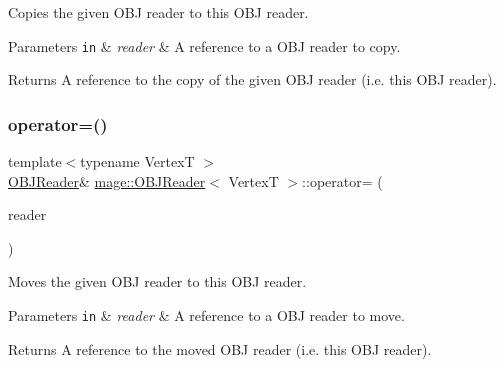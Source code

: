 Copies the given O\+BJ reader to this O\+BJ reader.


\begin{DoxyParams}[1]{Parameters}
\mbox{\tt in}  & {\em reader} & A reference to a O\+BJ reader to copy. \\
\hline
\end{DoxyParams}
\begin{DoxyReturn}{Returns}
A reference to the copy of the given O\+BJ reader (i.\+e. this O\+BJ reader). 
\end{DoxyReturn}
\hypertarget{classmage_1_1_o_b_j_reader_ac795c3b1d19ecf38735b76bc5b97fa80}{}\label{classmage_1_1_o_b_j_reader_ac795c3b1d19ecf38735b76bc5b97fa80} 
\subsubsection{\texorpdfstring{operator=()}{operator=()}\hspace{0.1cm}{\footnotesize\ttfamily [2/2]}}
{\footnotesize\ttfamily template$<$typename VertexT $>$ \\
\hyperlink{classmage_1_1_o_b_j_reader}{O\+B\+J\+Reader}\& \hyperlink{classmage_1_1_o_b_j_reader}{mage\+::\+O\+B\+J\+Reader}$<$ VertexT $>$\+::operator= (\begin{DoxyParamCaption}\item[{\hyperlink{classmage_1_1_o_b_j_reader}{O\+B\+J\+Reader}$<$ VertexT $>$ \&\&}]{reader }\end{DoxyParamCaption})\hspace{0.3cm}{\ttfamily [delete]}}

Moves the given O\+BJ reader to this O\+BJ reader.


\begin{DoxyParams}[1]{Parameters}
\mbox{\tt in}  & {\em reader} & A reference to a O\+BJ reader to move. \\
\hline
\end{DoxyParams}
\begin{DoxyReturn}{Returns}
A reference to the moved O\+BJ reader (i.\+e. this O\+BJ reader). 
\end{DoxyReturn}
\hypertarget{classmage_1_1_o_b_j_reader_a248977c8300575ed2bab04df26197919}{}\label{classmage_1_1_o_b_j_reader_a248977c8300575ed2bab04df26197919} 
